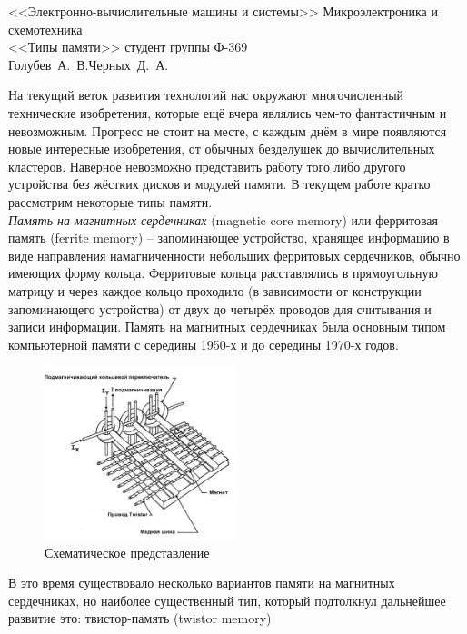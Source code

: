 


{<<Электронно-вычислительные машины и системы>>}
{Микроэлектроника и схемотехника \\ <<Типы памяти>>}
{студент группы Ф-369\\Голубев~А.~В.}{Черных~Д.~А.}{}

На текущий веток развития технологий нас окружают многочисленный технические 
изобретения, которые ещё вчера являлись чем-то фантастичным и невозможным. 
Прогресс не стоит на месте, с каждым днём в мире появляются новые интересные 
изобретения, от обычных безделушек до вычислительных кластеров. Наверное 
невозможно представить работу того либо другого устройства без жёстких 
дисков и модулей памяти. В текущем работе кратко рассмотрим некоторые 
типы памяти. \\

\emph{Память на магнитных сердечниках} (magnetic core memory) или ферритовая 
память (ferrite memory) -- запоминающее устройство, хранящее информацию 
в виде направления намагниченности небольших ферритовых сердечников, 
обычно имеющих форму кольца. Ферритовые кольца расставлялись в 
прямоугольную матрицу и через каждое кольцо проходило (в зависимости от 
конструкции запоминающего устройства) от двух до четырёх проводов для 
считывания и записи информации. Память на магнитных сердечниках была 
основным типом компьютерной памяти с середины 1950-х и до середины 
1970-х годов.

\begin{figure}
    \vspace{-2ex}
    \includegraphics[width=0.5\textwidth]{images/image_01}
    \parbox{0.5\textwidth}{\caption{Схематическое представление}}
\end{figure}

В это время существовало несколько вариантов памяти на магнитных 
сердечниках, но наиболее существенный тип, который подтолкнул 
дальнейшее развитие это: твистор-память (twistor memory)


